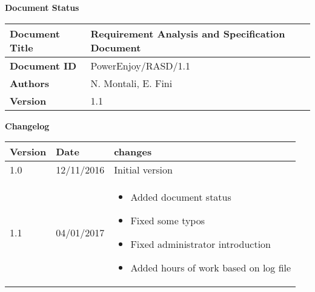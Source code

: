\textbf{\Huge Document Status}
\begin{center}
    \begin{tabular}{ | l | p{10cm} |}
    \hline
    \textbf{Document Title} & Requirement Analysis and Specification Document \\ \hline
    \textbf{Document ID} & PowerEnjoy/RASD/1.1 \\ \hline
    \textbf{Authors} & N. Montali, E. Fini \\ \hline
    \textbf{Version} & 1.1 \\ \hline
    \end{tabular}
\textbf{\Large Changelog}
     \begin{tabular}{ | l | l | p{10cm} |}
    \hline
    \textbf{Version} & \textbf{Date} & \textbf{changes} \\ \hline
    1.0 & 12/11/2016 & Initial version \\ \hline
    1.1 & 04/01/2017 & \begin{itemize}
    	\item Added document status 
	\item Fixed some typos
	\item Fixed administrator introduction
	\item Added hours of work based on log file
    \end{itemize}
    \\ \hline
    \end{tabular}
\end{center}